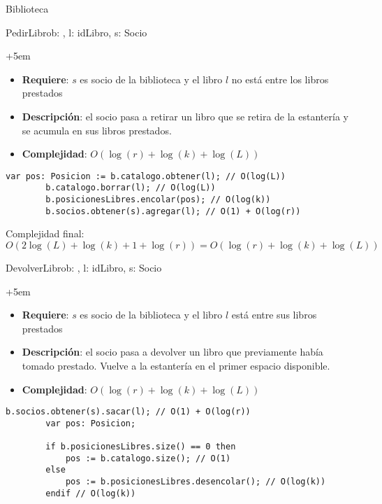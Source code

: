 \begin{module}{Biblioteca}{}{}{}
	\begin{proc}{PedirLibro}{\Inout b: \moduletype, \In l: idLibro, \In s: Socio}{}
		\begin{adjustwidth}{+5em}{}
			\begin{itemize}
				\item \textbf{Requiere}: $s$ es socio de la biblioteca y el libro $l$ no está entre los libros prestados
				\item \textbf{Descripción}: el socio pasa a retirar un libro que se retira de la estantería y se acumula en sus libros prestados.
				\item \textbf{Complejidad}: $O(\log(r) + \log(k) + \log(L))$
			\end{itemize}
		\end{adjustwidth}

		\begin{lstlisting}[numbers=none,frame=none]
		var pos: Posicion := b.catalogo.obtener(l); // O(log(L))
		b.catalogo.borrar(l); // O(log(L))
		b.posicionesLibres.encolar(pos); // O(log(k))
		b.socios.obtener(s).agregar(l); // O(1) + O(log(r))
		\end{lstlisting}
		Complejidad final: $O(2\log(L) + \log(k) + 1 + \log(r)) = O(\log(r) + \log(k) + \log(L))$
	\end{proc}

	\pagebreak

	\begin{proc}{DevolverLibro}{\Inout b: \moduletype, \In l: idLibro, \In s: Socio}{}
		\begin{adjustwidth}{+5em}{}
			\begin{itemize}
				\item \textbf{Requiere}: $s$ es socio de la biblioteca y el libro $l$ está entre sus libros prestados
				\item \textbf{Descripción}: el socio pasa a devolver un libro que previamente había tomado prestado. Vuelve a la estantería en el primer espacio disponible.
				\item \textbf{Complejidad}: $O(\log(r) + \log(k) + \log(L))$
			\end{itemize}
		\end{adjustwidth}

		\begin{lstlisting}[numbers=none,frame=none]
		b.socios.obtener(s).sacar(l); // O(1) + O(log(r))
		var pos: Posicion;

		if b.posicionesLibres.size() == 0 then
			pos := b.catalogo.size(); // O(1)
		else
			pos := b.posicionesLibres.desencolar(); // O(log(k))
		endif // O(log(k))


\end{lstlisting}
\end{proc}
\end{module}
